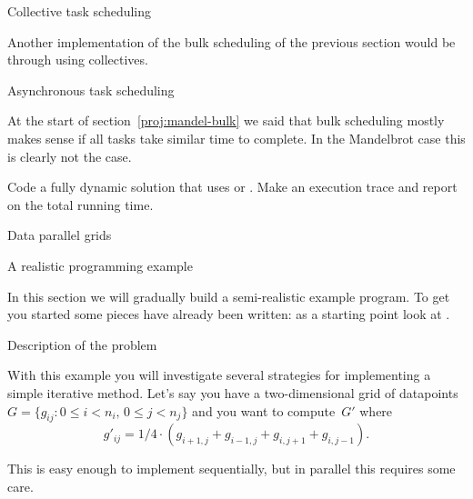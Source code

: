  {Collective task scheduling}
\label{proj:mandel-collective}

Another implementation of the bulk scheduling of the previous section
would be through using collectives.

 {Asynchronous task scheduling}

At the start of section~\ref{proj:mandel-bulk} we said that bulk scheduling
mostly makes sense if all tasks take similar time to complete.
In the Mandelbrot case this is clearly not the case.

\begin{exercise}
  Code a fully dynamic solution that uses  or .
  Make an execution trace and report on the total running time.
\end{exercise}

 {Data parallel grids}

 {A realistic programming example}

In this section we will gradually build a semi-realistic example
program. To get you started some pieces have already been written:
as a starting point look at .

 {Description of the problem}

With this example you will investigate several strategies for
implementing a simple iterative method. Let's say you have a
two-dimensional grid of datapoints $G=\{g_{ij}\colon 0\leq
i<n_i,\,0\leq j<n_j\}$ and you want to compute~$G'$ where
\begin{equation}
g'_{ij} = 1/4 \cdot (g_{i+1,j}+g_{i-1,j}+g_{i,j+1}+g_{i,j-1}).
\label{eq:grid-update}
\end{equation}

This is easy enough to implement sequentially, but in parallel this
requires some care.

